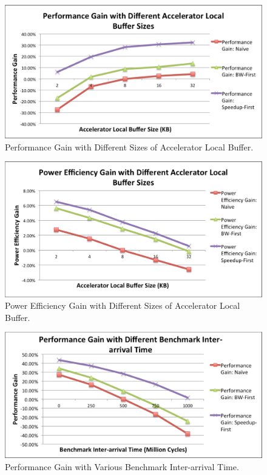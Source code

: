 \begin{figure}
    \centering
    \includegraphics[width=4.5in]{Acc-Buffer-Performance}
    \caption{Performance Gain with Different Sizes of Accelerator Local Buffer.}
    \label{fig_acc_buffer_perf}
\end{figure}

\begin{figure}
    \centering
    \includegraphics[width=4.5in]{Acc-Buffer-Power}
    \caption{Power Efficiency Gain with Different Sizes of Accelerator Local Buffer.}
    \label{fig_acc_buffer_power}
\end{figure}

\begin{figure}
    \centering
    \includegraphics[width=4.5in]{Benchmark-Switching-Time}
    \caption{Performance Gain with Various Benchmark Inter-arrival Time.}
    \label{fig_benchmark-switching}
\end{figure}

